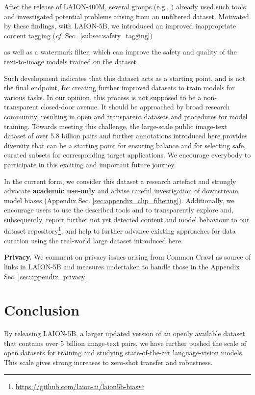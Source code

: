 After the release of LAION-400M, several groups (e.g., \citep{birhane2021multimodal}) already used such tools and investigated potential problems arising from an unfiltered dataset. Motivated by these findings, with LAION-5B, we introduced an improved inappropriate content tagging (\textit{cf.} Sec.~\ref{subsec:safety_tagging}) 

as well as a watermark filter, which can improve the safety and quality of the text-to-image models trained on the dataset.

Such development indicates that this dataset acts as a starting point, and is not the final endpoint, for creating further improved datasets to train models for various tasks. In our opinion, this process is not supposed to be a non-transparent closed-door avenue. It should be approached by broad research community, resulting in open and transparent datasets and procedures for model training. Towards meeting this challenge, the large-scale public image-text dataset of over 5.8 billion pairs and further annotations introduced here provides diversity that can be a starting point for ensuring balance and for selecting safe, curated subsets for corresponding target applications. We encourage everybody to participate in this exciting and important future journey.

In the current form, we consider this dataset a research artefact and strongly advocate \textbf{academic use-only} and advise careful investigation of downstream model biases (Appendix Sec. \ref{sec:appendix_clip_filtering}). Additionally, we encourage users to use the described tools and to transparently explore and, subsequently, report further not yet detected content and model behaviour to our dataset repository\footnote{\href{https://github.com/laion-ai/laion5b-bias}{https://github.com/laion-ai/laion5b-bias}}, and help to further advance existing approaches for data curation using the real-world large dataset introduced here.

\textbf{Privacy.} We comment on privacy issues arising from Common Crawl as source of links in LAION-5B and measures undertaken to handle those in the Appendix Sec. \ref{sec:appendix_privacy}

\section{Conclusion}
\label{sec:conclusion}

By releasing LAION-5B, a larger updated version of an openly available dataset that contains over 5 billion image-text pairs, we have further pushed the scale of open datasets for training and studying state-of-the-art language-vision models. This scale gives strong increases to zero-shot transfer and robustness.

